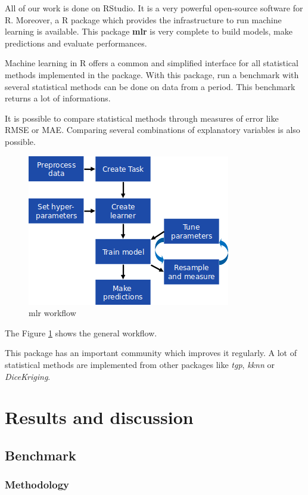 \documentclass[12pt,twoside]{reedthesis}
\theoremstyle{definition}
\theoremstyle{definition}
\theoremstyle{definition}
\theoremstyle{remark}
\begin{document}
All of our work is done on RStudio. It is a very powerful open-source
software for R. Moreover, a R package which provides the infrastructure
to run machine learning is available. This package \textbf{mlr} is very
complete to build models, make predictions and evaluate performances.

Machine learning in R offers a common and simplified interface for all
statistical methods implemented in the package. With this package, run a
benchmark with several statistical methods can be done on data from a
period. This benchmark returns a lot of informations.

It is possible to compare statistical methods through measures of error
like RMSE or MAE. Comparing several combinations of explanatory
variables is also possible.
\begin{figure}

{\centering \includegraphics[width=0.6\linewidth]{figure/mlr_workflow} 

}

\caption{mlr workflow}\label{fig:mlr}
\end{figure}
The Figure \ref{fig:mlr} shows the general workflow.

This package has an important community which improves it regularly. A
lot of statistical methods are implemented from other packages like
\emph{tgp}, \emph{kknn} or \emph{DiceKriging}.

\chapter{Results and discussion}\label{results}

\section{Benchmark}\label{benchmark}

\subsection{Methodology}\label{methodology}
\end{document}
